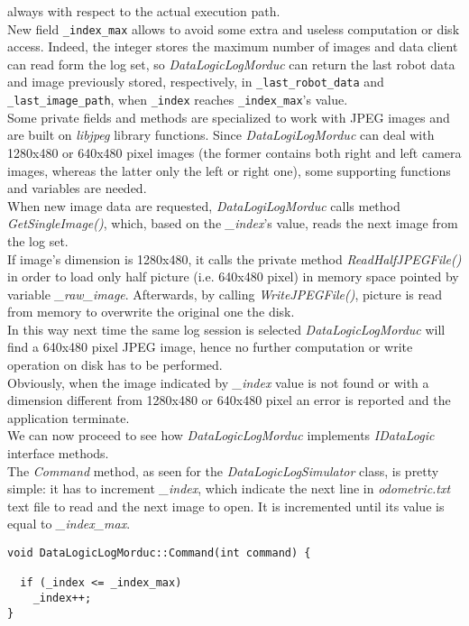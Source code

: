 always with respect to the actual execution path.
\\
New field \texttt{\_index\_max} allows to avoid some extra and
useless computation or disk access. Indeed, the integer stores
the maximum number
of images and data client can read form the log set, so
\textit{DataLogicLogMorduc}  can
return the last robot data and image previously stored, respectively,
in \texttt{\_last\_robot\_data} and \texttt{\_last\_image\_path},
when \texttt{\_index}
reaches \texttt{\_index\_max}'s value.
\\
Some private fields and methods are specialized to work with JPEG
images and are built on \textit{libjpeg} library functions.
Since \textit{DataLogiLogMorduc} can deal with 1280x480
or 640x480 pixel images (the former contains both right and left
camera images, whereas the latter only the left or right one),
some supporting functions and variables are needed.
\\
When new image data are requested, \textit{DataLogiLogMorduc}
calls method \textit{GetSingleImage()}, which, based on the
\textit{\_index}'s value, reads the next image from the log set.
\\
If image's dimension is 1280x480, it calls the private method
\textit{ReadHalfJPEGFile()} in order to load only half 
picture (i.e. 640x480 pixel) in memory space pointed by variable
\textit{\_raw\_image}. Afterwards, by calling \textit{WriteJPEGFile()},
picture is read from memory to overwrite the original one the disk.
\\
In this way next time the same log session is selected \textit{DataLogicLogMorduc}
will find a 640x480 pixel JPEG image, hence no further computation
or write operation on disk has to be performed.
\\
Obviously, when the image indicated by \textit{\_index} value is
not found or with a dimension different from 1280x480 or
640x480 pixel an error is reported and the application terminate.
\\
We can now proceed to see how \textit{DataLogicLogMorduc} implements
\textit{IDataLogic} interface methods.
\\
The \textit{Command} method, as seen for the \textit{DataLogicLogSimulator}
class, is pretty simple: it has to increment \textit{\_index},
which indicate the next line in \textit{odometric.txt}
text file to read and the next image to open. It is incremented until
its value is equal to \textit{\_index\_max}.

\begin{lstlisting}[caption={\texttt{DataLogicLogMorduc::Command() method}},
    label={code:datalogiclogmorduc:command}, frame=trBL]
void DataLogicLogMorduc::Command(int command) {

  if (_index <= _index_max)
    _index++;
}
\end{lstlisting}

